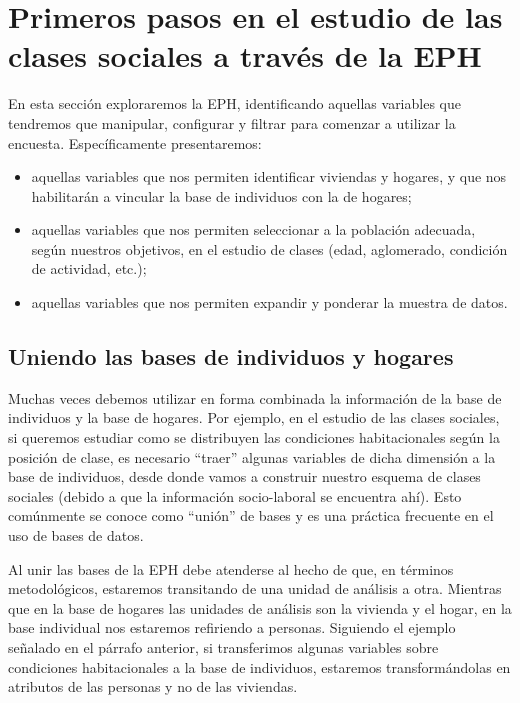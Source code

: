 \documentclass[
]{book}
\begin{document}
\hypertarget{eph3}{%
\section{Primeros pasos en el estudio de las clases sociales a través de la EPH}\label{eph3}}

En esta sección exploraremos la EPH, identificando aquellas variables que tendremos que manipular, configurar y filtrar para comenzar a utilizar la encuesta. Específicamente presentaremos:

\begin{itemize}
\item
  aquellas variables que nos permiten identificar viviendas y hogares, y que nos habilitarán a vincular la base de individuos con la de hogares;
\item
  aquellas variables que nos permiten seleccionar a la población adecuada, según nuestros objetivos, en el estudio de clases (edad, aglomerado, condición de actividad, etc.);
\item
  aquellas variables que nos permiten expandir y ponderar la muestra de datos.
\end{itemize}

\hypertarget{uniendo-las-bases-de-individuos-y-hogares}{%
\subsection{Uniendo las bases de individuos y hogares}\label{uniendo-las-bases-de-individuos-y-hogares}}

Muchas veces debemos utilizar en forma combinada la información de la base de individuos y la base de hogares. Por ejemplo, en el estudio de las clases sociales, si queremos estudiar como se distribuyen las condiciones habitacionales según la posición de clase, es necesario ``traer'' algunas variables de dicha dimensión a la base de individuos, desde donde vamos a construir nuestro esquema de clases sociales (debido a que la información socio-laboral se encuentra ahí). Esto comúnmente se conoce como ``unión'' de bases y es una práctica frecuente en el uso de bases de datos.

Al unir las bases de la EPH debe atenderse al hecho de que, en términos metodológicos, estaremos transitando de una unidad de análisis a otra. Mientras que en la base de hogares las unidades de análisis son la vivienda y el hogar, en la base individual nos estaremos refiriendo a personas. Siguiendo el ejemplo señalado en el párrafo anterior, si transferimos algunas variables sobre condiciones habitacionales a la base de individuos, estaremos transformándolas en atributos de las personas y no de las viviendas.
\end{document}
